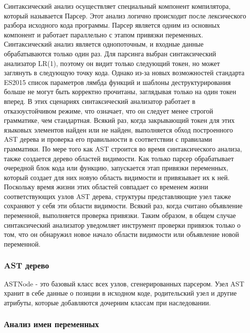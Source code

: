 Синтаксический анализ осуществляет специальный компонент компилятора, который называется Парсер.
Этот анализ логично происходит после лексического разбора исходного кода программы.
Парсер является одним из основных компонент и работает параллельно с этапом привязки переменных.
Синтаксический анализ является однопоточным, и входные данные обрабатываются только один раз.
Для парсинга выбран синтаксический анализатор LR(1), поэтому он видит только следующий токен,
но может заглянуть в следующую точку кода.
Однако из-за новых возможностей стандарта ES2015 список параметров лямбда функций и шаблоны деструктурирования
больше не могут быть корректно прочитаны, заглядывая только на один токен вперед.
В этих сценариях синтаксический анализатор работает в отказоустойчивом режиме, что означает,
что он следует менее строгой грамматике, чем стандартная.
Всякий раз, когда закрывающий токен для этих языковых элементов найден или не найден, выполняется обход построенного AST
дерева и проверка его правильности в соответствии с правилами грамматики.
По мере того как AST строится во время синтаксического анализа, также создается дерево областей видимости.
Как только парсер обрабатывает очередной блок кода или функцию, запускается этап привязки переменных,
который создает для них новую область видимости и привязывает их к ней.
Поскольку время жизни этих областей совпадает со временем жизни соответствующих узлов AST дерева,
структуры представляющие узел также сохраняют у себя эти области видимости.
Всякий раз, когда считано объявление переменной, выполняется проверка привязки.
Таким образом, в общем случае синтаксический анализатор уведомляет инструмент проверки привязок только о том,
что он обнаружил новое начало области видимости или объявление новой переменной.

\subsubsection{AST дерево}

ASTNode - это базовый класс всех узлов, сгенерированных парсером.
Узел AST хранит в себе данные о позиции в исходном коде, родительский узел и другие атрибуты,
которые добавляются дочерним классам при наследовании.

\subsubsection{Анализ имен переменных}

